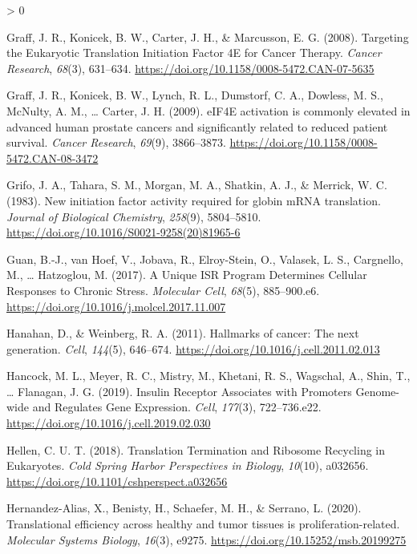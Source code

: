 \documentclass[
  12pt,
  openany]{book}
\newlength{\cslhangindent}
\newenvironment{CSLReferences}[2] %
 {%
  \setlength{\parindent}{0pt}
  \ifodd #1 \everypar{\setlength{\hangindent}{\cslhangindent}}\ignorespaces\fi
  \ifnum #2 > 0
  \setlength{\parskip}{#2\baselineskip}
  \fi
 }%
 {}
\begin{document}
\begin{CSLReferences}{1}{0}
\leavevmode\hypertarget{ref-Graff2008}{}%
Graff, J. R., Konicek, B. W., Carter, J. H., \& Marcusson, E. G. (2008). Targeting the {Eukaryotic Translation Initiation Factor 4E} for {Cancer Therapy}. \emph{Cancer Research}, \emph{68}(3), 631--634. \url{https://doi.org/10.1158/0008-5472.CAN-07-5635}

\leavevmode\hypertarget{ref-Graff2009}{}%
Graff, J. R., Konicek, B. W., Lynch, R. L., Dumstorf, C. A., Dowless, M. S., McNulty, A. M., \ldots{} Carter, J. H. (2009). {eIF4E} activation is commonly elevated in advanced human prostate cancers and significantly related to reduced patient survival. \emph{Cancer Research}, \emph{69}(9), 3866--3873. \url{https://doi.org/10.1158/0008-5472.CAN-08-3472}

\leavevmode\hypertarget{ref-Grifo1983}{}%
Grifo, J. A., Tahara, S. M., Morgan, M. A., Shatkin, A. J., \& Merrick, W. C. (1983). New initiation factor activity required for globin {mRNA} translation. \emph{Journal of Biological Chemistry}, \emph{258}(9), 5804--5810. \url{https://doi.org/10.1016/S0021-9258(20)81965-6}

\leavevmode\hypertarget{ref-Guan2017}{}%
Guan, B.-J., van Hoef, V., Jobava, R., Elroy-Stein, O., Valasek, L. S., Cargnello, M., \ldots{} Hatzoglou, M. (2017). A {Unique ISR Program Determines Cellular Responses} to {Chronic Stress}. \emph{Molecular Cell}, \emph{68}(5), 885--900.e6. \url{https://doi.org/10.1016/j.molcel.2017.11.007}

\leavevmode\hypertarget{ref-Hanahan2011}{}%
Hanahan, D., \& Weinberg, R. A. (2011). Hallmarks of cancer: {The} next generation. \emph{Cell}, \emph{144}(5), 646--674. \url{https://doi.org/10.1016/j.cell.2011.02.013}

\leavevmode\hypertarget{ref-Hancock2019}{}%
Hancock, M. L., Meyer, R. C., Mistry, M., Khetani, R. S., Wagschal, A., Shin, T., \ldots{} Flanagan, J. G. (2019). Insulin {Receptor Associates} with {Promoters Genome}-wide and {Regulates Gene Expression}. \emph{Cell}, \emph{177}(3), 722--736.e22. \url{https://doi.org/10.1016/j.cell.2019.02.030}

\leavevmode\hypertarget{ref-Hellen2018}{}%
Hellen, C. U. T. (2018). Translation {Termination} and {Ribosome Recycling} in {Eukaryotes}. \emph{Cold Spring Harbor Perspectives in Biology}, \emph{10}(10), a032656. \url{https://doi.org/10.1101/cshperspect.a032656}

\leavevmode\hypertarget{ref-Hernandez-Alias2020}{}%
Hernandez-Alias, X., Benisty, H., Schaefer, M. H., \& Serrano, L. (2020). Translational efficiency across healthy and tumor tissues is proliferation-related. \emph{Molecular Systems Biology}, \emph{16}(3), e9275. \url{https://doi.org/10.15252/msb.20199275}


\end{CSLReferences}
\end{document}
